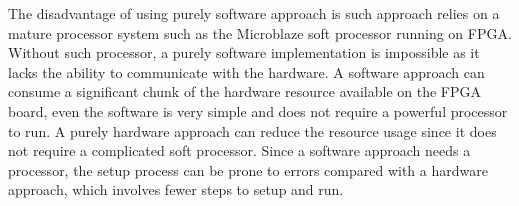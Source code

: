 \documentclass[11pt,letterpaper,titlepage]{article}
\begin{document}
The disadvantage of using purely software approach is such approach relies on a mature processor system such as the Microblaze soft processor running on FPGA. Without such processor, a purely software implementation is impossible as it lacks the ability to communicate with the hardware. A software approach can consume a significant chunk of the hardware resource available on the FPGA board, even the software is very simple and does not require a powerful processor to run. A purely hardware approach can reduce the resource usage since it does not require a complicated soft processor. Since a software approach needs a processor, the setup process can be prone to errors compared with a hardware approach, which involves fewer steps to setup and run.

\newpage

\begin{appendices}

\end{appendices}
\end{document}
